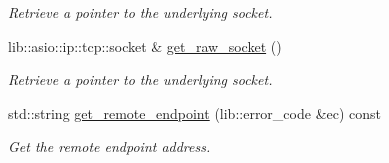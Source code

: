 \begin{DoxyCompactItemize}
\begin{DoxyCompactList}\small\item\em Retrieve a pointer to the underlying socket. \end{DoxyCompactList}\item 
lib\+::asio\+::ip\+::tcp\+::socket \& \hyperlink{classwebsocketpp_1_1transport_1_1asio_1_1basic__socket_1_1connection_a2735b03146b13e956bf58cd9f2e51ff6}{get\+\_\+raw\+\_\+socket} ()
\begin{DoxyCompactList}\small\item\em Retrieve a pointer to the underlying socket. \end{DoxyCompactList}\item 
std\+::string \hyperlink{classwebsocketpp_1_1transport_1_1asio_1_1basic__socket_1_1connection_a284a75098ce6c3d73011ef8309acc17b}{get\+\_\+remote\+\_\+endpoint} (lib\+::error\+\_\+code \&ec) const 
\begin{DoxyCompactList}\small\item\em Get the remote endpoint address. \end{DoxyCompactList}\end{DoxyCompactItemize}

